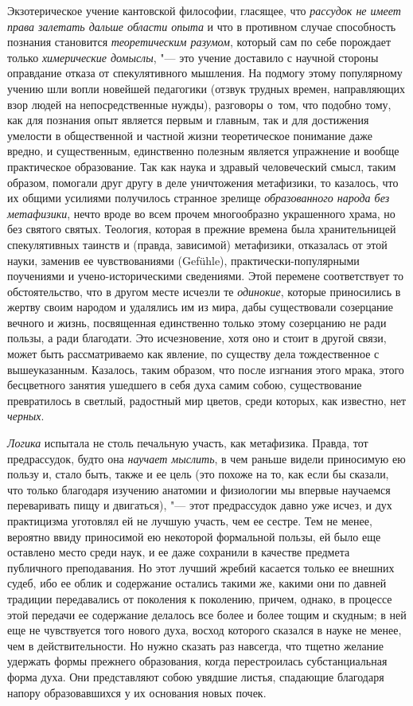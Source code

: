 \label{bkm:Ref474526580}Экзотерическое учение кантовской философии, гласящее,
что {\em рассудок не имеет права залетать дальше области опыта} и что в
противном случае способность познания становится {\em теоретическим разумом},
который сам по себе порождает только {\em химерические домыслы}, "--- это
учение доставило с научной стороны оправдание отказа от спекулятивного
мышления. На подмогу этому популярному учению шли вопли новейшей педагогики
(отзвук трудных времен, направляющих взор людей на непосредственные нужды),
разговоры о~том, что подобно тому, как для познания опыт является первым и
главным, так и для достижения умелости в общественной и частной жизни
теоретическое понимание даже вредно, и существенным, единственно полезным
является упражнение и вообще практическое образование. Так как наука и здравый
человеческий смысл, таким образом, помогали друг другу в деле уничтожения
метафизики, то казалось, что их общими усилиями получилось странное зрелище
{\em образованного народа без метафизики}, нечто вроде во всем прочем
многообразно украшенного храма, но без святого святых. Теология, которая в
прежние времена была хранительницей спекулятивных таинств и (правда, зависимой)
метафизики, отказалась от этой науки, заменив ее чувствованиями (Gefühle),
практически-популярными поучениями и учено-историческими сведениями. Этой
перемене соответствует то обстоятельство, что в другом месте исчезли те
{\em одинокие}, которые приносились в жертву своим народом и удалялись им из
мира, дабы существовали созерцание вечного и жизнь, посвященная единственно
только этому созерцанию не ради пользы, а ради благодати. Это исчезновение,
хотя оно и стоит в другой связи, может быть рассматриваемо как явление, по
существу дела тождественное с вышеуказанным. Казалось, таким образом, что после
изгнания этого мрака, этого бесцветного занятия ушедшего в себя духа самим
собою, существование превратилось в светлый, радостный мир цветов, среди
которых, как известно, нет {\em черных}.

{\em Логика} испытала не столь печальную участь, как метафизика. Правда, тот
предрассудок, будто она {\em научает мыслить}, в чем раньше видели приносимую
ею пользу и, стало быть, также и ее цель (это похоже на то, как если бы
сказали, что только благодаря изучению анатомии и физиологии мы впервые
научаемся переваривать пищу и двигаться), "--- этот предрассудок давно уже
исчез, и дух практицизма уготовлял ей не лучшую участь, чем ее сестре. Тем не
менее, вероятно ввиду приносимой ею некоторой формальной пользы, ей было еще
оставлено место среди наук, и ее даже сохранили в качестве предмета публичного
преподавания. Но этот лучший жребий касается только ее внешних судеб, ибо ее
облик и содержание остались такими же, какими они по давней традиции
передавались от поколения к поколению, причем, однако, в процессе этой передачи
ее содержание делалось все более и более тощим и скудным; в ней еще не
чувствуется того нового духа, восход которого сказался в науке не менее, чем в
действительности. Но нужно сказать раз навсегда, что тщетно желание удержать
формы прежнего образования, когда перестроилась субстанциальная форма духа. Они
представляют собою увядшие листья, спадающие благодаря напору образовавшихся у
их основания новых почек.


